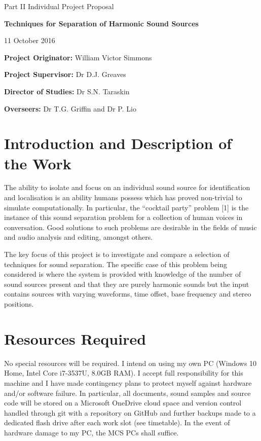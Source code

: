 \documentclass[12pt,a4paper,twoside,openright]{report}
\begin{document}
\vspace{5mm}

\centerline{\large Part II Individual Project Proposal}
\vspace{5mm}
\centerline{\Large\bf Techniques for Separation of Harmonic Sound Sources}
\vspace{5mm}
\centerline{\large 11 October 2016}

{\bf Project Originator:} William Victor Simmons

{\bf Project Supervisor:} Dr D.J. Greaves

{\bf Director of Studies:} Dr S.N. Taraskin

{\bf Overseers:} Dr T.G. Griffin and Dr P. Lio

\section*{Introduction and Description of the Work}

The ability to isolate and focus on an individual sound source for identification and localisation is an ability humans possess which has proved non-trivial to simulate computationally. In particular, the ``cocktail party'' problem [1] is the instance of this sound separation problem for a collection of human voices in conversation. Good solutions to such problems are desirable in the fields of music and audio analysis and editing, amongst others.

The key focus of this project is to investigate and compare a selection of techniques for sound separation. The specific case of this problem being considered is where the system is provided with knowledge of the number of sound sources present and that they are purely harmonic sounds but the input contains sources with varying waveforms, time offset, base frequency and stereo positions.

\section*{Resources Required}

No special resources will be required. I intend on using my own PC (Windows 10 Home, Intel Core i7-3537U, 8.0GB RAM). I accept full responsibility for this machine and I have made contingency plans to protect myself against hardware and/or software failure. In particular, all documents, sound samples and source code will be stored on a Microsoft OneDrive cloud space and version control handled through git with a repository on GitHub and further backups made to a dedicated flash drive after each work slot (see timetable). In the event of hardware damage to my PC, the MCS PCs shall suffice.
\end{document}
